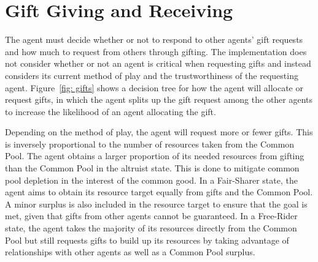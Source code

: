\section{Gift Giving and Receiving}
The agent must decide whether or not to respond to other agents' gift requests and how much to request from others through gifting. The implementation does not consider whether or not an agent is critical when requesting gifts and instead considers its current method of play and the trustworthiness of the requesting agent. Figure~\ref{fig: gifts} shows a decision tree for how the agent will allocate or request gifts, in which the agent splits up the gift request among the other agents to increase the likelihood of an agent allocating the gift.


\begin{figure}[!htb]
\end{figure}



Depending on the method of play, the agent will request more or fewer gifts. This is inversely proportional to the number of resources taken from the Common Pool. The agent obtains a larger proportion of its needed resources from gifting than the Common Pool in the altruist state. This is done to mitigate common pool depletion in the interest of the common good. In a Fair-Sharer state, the agent aims to obtain its resource target equally from gifts and the Common Pool. A minor surplus is also included in the resource target to ensure that the goal is met, given that gifts from other agents cannot be guaranteed. In a Free-Rider state, the agent takes the majority of its resources directly from the Common Pool but still requests gifts to build up its resources by taking advantage of relationships with other agents as well as a Common Pool surplus.

